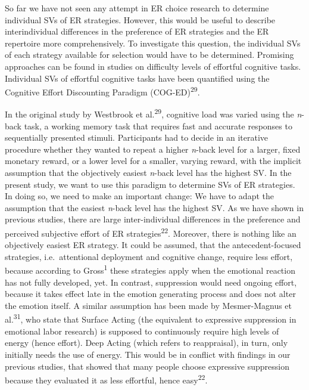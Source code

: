 \documentclass[
  english,
  man,floatsintext]{apa6}
\begin{document}
So far we have not seen any attempt in ER choice research to determine individual SVs of ER strategies.
However, this would be useful to describe interindividual differences in the preference of ER strategies and the ER repertoire more comprehensively.
To investigate this question, the individual SVs of each strategy available for selection would have to be determined.
Promising approaches can be found in studies on difficulty levels of effortful cognitive tasks.\\
Individual SVs of effortful cognitive tasks have been quantified using the Cognitive Effort Discounting Paradigm (COG-ED)\textsuperscript{29}.

In the original study by Westbrook et al.\textsuperscript{29}, cognitive load was varied using the \emph{n}-back task, a working memory task that requires fast and accurate responses to sequentially presented stimuli.
Participants had to decide in an iterative procedure whether they wanted to repeat a higher \emph{n}-back level for a larger, fixed monetary reward, or a lower level for a smaller, varying reward, with the implicit assumption that the objectively easiest \emph{n}-back level has the highest SV.
In the present study, we want to use this paradigm to determine SVs of ER strategies.
In doing so, we need to make an important change: We have to adapt the assumption that the easiest \emph{n}-back level has the highest SV.
As we have shown in previous studies, there are large inter-individual differences in the preference and perceived subjective effort of ER strategies\textsuperscript{22}.
Moreover, there is nothing like an objectively easiest ER strategy.
It could be assumed, that the antecedent-focused strategies, i.e.~attentional deployment and cognitive change, require less effort, because according to Gross\textsuperscript{1} these strategies apply when the emotional reaction has not fully developed, yet.
In contrast, suppression would need ongoing effort, because it takes effect late in the emotion generating process and does not alter the emotion itself.
A similar assumption has been made by Mesmer-Magnus et al.\textsuperscript{31}, who state that Surface Acting (the equivalent to expressive suppression in emotional labor research) is supposed to continuously require high levels of energy (hence effort).
Deep Acting (which refers to reappraisal), in turn, only initially needs the use of energy.
This would be in conflict with findings in our previous studies, that showed that many people choose expressive suppression because they evaluated it as less effortful, hence easy\textsuperscript{22}.
\end{document}
